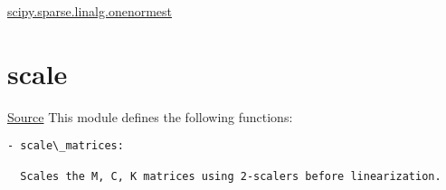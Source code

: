 \documentclass[letterpaper,10pt,english]{sphinxmanual}
\begin{document}


\href{http://docs.scipy.org/doc/scipy-dev/reference/generated/scipy.sparse.linalg.onenormest.html}{scipy.sparse.linalg.onenormest}




\section{scale}
\label{index:scale}
\href{https://bitbucket.org/akadar/brakesqueal0.1/src/master/brake/initialize/scale.py?at=master}{Source}
\label{index:module-brake.initialize.scale}
This module defines the following functions:

\begin{Verbatim}[commandchars=\\\{\}]
- scale\_matrices:

  Scales the M, C, K matrices using 2-scalers before linearization.
\end{Verbatim}
\end{document}
